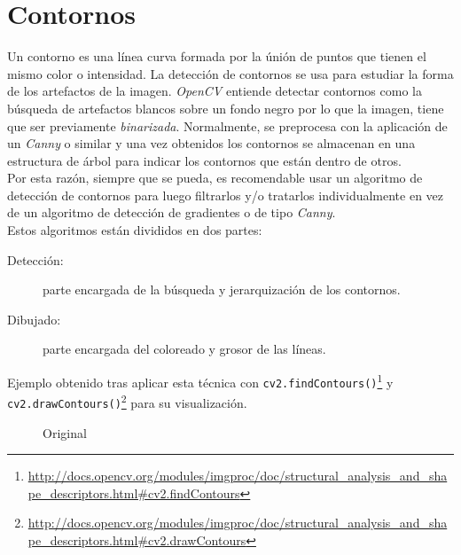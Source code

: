 \section{Contornos}\label{tecnica:contornos}
Un contorno es una línea curva formada por la únión de puntos que
tienen el mismo color o intensidad. La detección de contornos
\emph{\citep*[Contours in OpenCV]{opencv_tutorial-bib}}
\emph{\citep*[5.1 Edge Tracking]{toennies2012guide}}se usa para
estudiar la forma de los artefactos de la imagen. \emph{OpenCV}
entiende detectar contornos como la búsqueda de artefactos blancos
sobre un fondo negro por lo que la imagen, tiene que ser previamente
\emph{binarizada}. Normalmente, se preprocesa con la aplicación de un
\emph{Canny} o similar y una vez obtenidos los contornos se almacenan
en una estructura de árbol para indicar los contornos que están dentro
de otros. \\
Por esta razón, siempre que se pueda, es recomendable usar un
algoritmo de detección de contornos para luego filtrarlos y/o
tratarlos individualmente en vez de un algoritmo de detección de
gradientes o de tipo \emph{Canny}.\\
Estos algoritmos están divididos en dos partes:
\begin{description}
\item[Detección:] parte encargada de la búsqueda y jerarquización de
  los contornos.
\item[Dibujado:] parte encargada del coloreado y grosor de las líneas.
\end{description}

Ejemplo obtenido tras aplicar esta técnica con
\texttt{cv2.findContours()}\footnote{\url{http://docs.opencv.org/modules/imgproc/doc/structural\_analysis\_and\_shape\_descriptors.html\#cv2.findContours}}
y
\texttt{cv2.drawContours()}\footnote{\url{http://docs.opencv.org/modules/imgproc/doc/structural\_analysis\_and\_shape\_descriptors.html\#cv2.drawContours}}
para su visualización.

\begin{figure}[H]
  \caption{Original}
  \centering \setlength\fboxsep{0pt} \setlength\fboxrule{0.5pt}
\end{figure}

